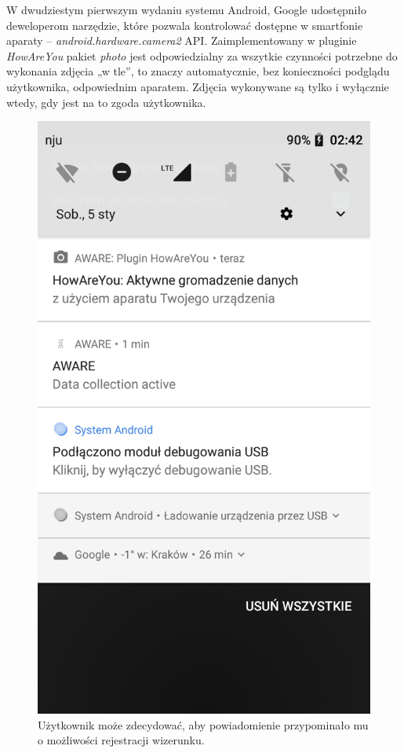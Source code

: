 W dwudziestym pierwszym wydaniu systemu Android, Google udostępniło deweloperom narzędzie, które pozwala kontrolować dostępne w smartfonie aparaty – \textit{android.hardware.camera2} API. Zaimplementowany w pluginie \textit{HowAreYou} pakiet \textit{photo} jest odpowiedzialny za wszytkie czynności potrzebne do wykonania zdjęcia „w tle”, to znaczy automatycznie, bez konieczności podglądu użytkownika, odpowiednim aparatem. Zdjęcia wykonywane są tylko i wyłącznie wtedy, gdy jest na to zgoda użytkownika.

\begin{figure}[H]
	\centering
	\includegraphics[scale=0.13]{rozdzial3/screen-background.png}
	\caption{Użytkownik może zdecydować, aby powiadomienie przypominało mu o możliwości rejestracji wizerunku.}
\end{figure}

